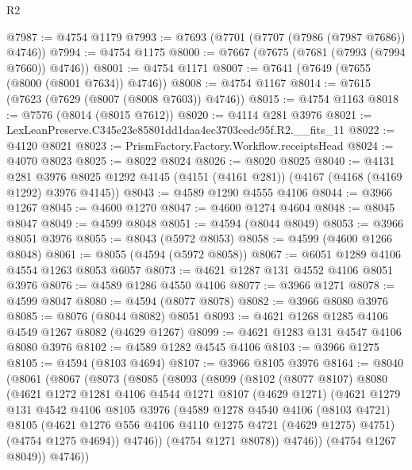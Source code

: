 \begin{lexlean}{R2}
\begin{coremodule}
@7987 := @4754 @1179
@7993 := @7693 (@7701 (@7707 (@7986 (@7987 @7686)) @4746))
@7994 := @4754 @1175
@8000 := @7667 (@7675 (@7681 (@7993 (@7994 @7660)) @4746))
@8001 := @4754 @1171
@8007 := @7641 (@7649 (@7655 (@8000 (@8001 @7634)) @4746))
@8008 := @4754 @1167
@8014 := @7615 (@7623 (@7629 (@8007 (@8008 @7603)) @4746))
@8015 := @4754 @1163
@8018 := @7576 (@8014 (@8015 @7612))
@8020 := @4114 @281 @3976
@8021 := LexLeanPreserve.C345e23e85801dd1daa4ec3703cedc95f.R2.__fits_11
@8022 := @4120 @8021
@8023 := PrismFactory.Factory.Workflow.receiptsHead
@8024 := @4070 @8023
@8025 := @8022 @8024
@8026 := @8020 @8025
@8040 := @4131
    @281
    @3976
    @8025
    @1292
    @4145
    (@4151 (@4161 @281))
    (@4167 (@4168 (@4169 @1292) @3976 @4145))
@8043 := @4589 @1290 @4555 @4106
@8044 := @3966 @1267
@8045 := @4600 @1270
@8047 := @4600 @1274 @4604
@8048 := @8045 @8047
@8049 := @4599 @8048
@8051 := @4594 (@8044 @8049)
@8053 := @3966 @8051 @3976
@8055 := @8043 (@5972 @8053)
@8058 := @4599 (@4600 @1266 @8048)
@8061 := @8055 (@4594 (@5972 @8058))
@8067 := @6051 @1289 @4106 @4554 @1263 @8053 @6057
@8073 := @4621 @1287 @131 @4552 @4106 @8051 @3976
@8076 := @4589 @1286 @4550 @4106
@8077 := @3966 @1271
@8078 := @4599 @8047
@8080 := @4594 (@8077 @8078)
@8082 := @3966 @8080 @3976
@8085 := @8076 (@8044 @8082) @8051
@8093 := @4621 @1268 @1285 @4106 @4549 @1267 @8082 (@4629 @1267)
@8099 := @4621 @1283 @131 @4547 @4106 @8080 @3976
@8102 := @4589 @1282 @4545 @4106
@8103 := @3966 @1275
@8105 := @4594 (@8103 @4694)
@8107 := @3966 @8105 @3976
@8164 := @8040
    (@8061
      (@8067
        (@8073
          (@8085
            (@8093
              (@8099
                (@8102
                  (@8077 @8107)
                  @8080
                  (@4621
                    @1272
                    @1281
                    @4106
                    @4544
                    @1271
                    @8107
                    (@4629 @1271)
                    (@4621
                      @1279
                      @131
                      @4542
                      @4106
                      @8105
                      @3976
                      (@4589
                        @1278
                        @4540
                        @4106
                        (@8103 @4721)
                        @8105
                        (@4621 @1276 @556 @4106 @4110 @1275 @4721 (@4629 @1275) @4751)
                        (@4754 @1275 @4694))
                      @4746))
                  (@4754 @1271 @8078))
                @4746))
            (@4754 @1267 @8049))
          @4746))

\end{coremodule}
\end{lexlean}
